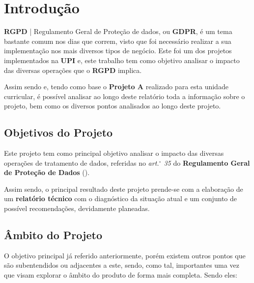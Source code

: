 \section{Introdução}

\textbf{RGPD} | Regulamento Geral de Proteção de dados, ou \textbf{GDPR}, é um tema bastante comum nos dias que correm, visto que foi necessário realizar a sua implementação nos mais diversos tipos de negócio. Este foi um dos projetos implementados na \textbf{UPI} e, este trabalho tem como objetivo analisar o impacto das diversas operações que o \textbf{RGPD} implica.

Assim sendo e, tendo como base o \textbf{Projeto A} realizado para esta unidade curricular,  é possível analisar ao longo deste relatório toda a informação sobre o projeto, bem como os diversos pontos analisados ao longo deste projeto.

\subsection{Objetivos do Projeto}

Este projeto tem como principal objetivo analisar o impacto das diversas operações de tratamento de dados, referidas no \textit{art.$^\circ$ 35} do \textbf{Regulamento Geral de Proteção de Dados} ().

Assim sendo, o principal resultado deste projeto prende-se com a elaboração de um \textbf{relatório técnico} com o diagnóstico da situação atual e um conjunto de possível recomendações, devidamente planeadas.

\subsection{Âmbito do Projeto}

O objetivo principal já referido anteriormente, porém existem outros pontos que são subentendidos ou adjacentes a este, sendo, como tal, importantes uma vez que visam explorar o âmbito do produto de forma mais completa. Sendo eles:

